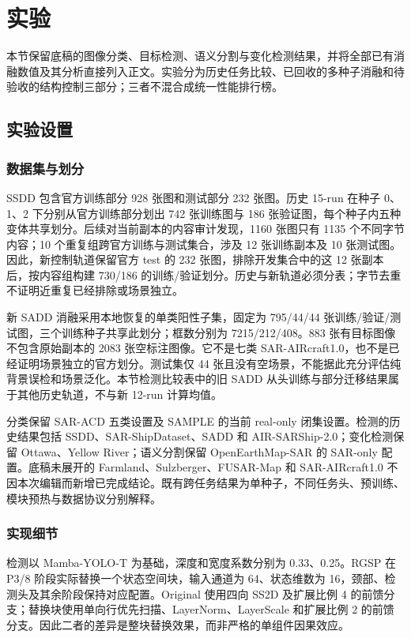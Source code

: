\section{实验}\label{sec:experiments}
本节保留底稿的图像分类、目标检测、语义分割与变化检测结果，并将全部已有消融数值及其分析直接列入正文。实验分为历史任务比较、已回收的多种子消融和待验收的结构控制三部分；三者不混合成统一性能排行榜。

\subsection{实验设置}\label{sec:experimental_settings}
\subsubsection{数据集与划分}\label{sec:datasets}
SSDD 包含官方训练部分 928 张图和测试部分 232 张图\cite{ssdd2017,ssdd2021}。历史 15-run 在种子 0、1、2 下分别从官方训练部分划出 742 张训练图与 186 张验证图，每个种子内五种变体共享划分。后续对当前副本的内容审计发现，1160 张图只有 1135 个不同字节内容；10 个重复组跨官方训练与测试集合，涉及 12 张训练副本及 10 张测试图。因此，新控制轨道保留官方 test 的 232 张图，排除开发集合中的这 12 张副本后，按内容组构建 730/186 的训练/验证划分。历史与新轨道必须分表；字节去重不证明近重复已经排除或场景独立。

新 SADD 消融采用本地恢复的单类阳性子集，固定为 795/44/44 张训练/验证/测试图，三个训练种子共享此划分；框数分别为 7215/212/408。883 张有目标图像不包含原始副本的 2083 张空标注图像。它不是七类 SAR-AIRcraft1.0，也不是已经证明场景独立的官方划分。测试集仅 44 张且没有空场景，不能据此充分评估纯背景误检和场景泛化。本节检测比较表中的旧 SADD 从头训练与部分迁移结果属于其他历史轨道，不与新 12-run 计算均值。

分类保留 SAR-ACD 五类设置及 SAMPLE 的当前 real-only 闭集设置。检测的历史结果包括 SSDD、SAR-ShipDataset、SADD 和 AIR-SARShip-2.0；变化检测保留 Ottawa、Yellow River；语义分割保留 OpenEarthMap-SAR 的 SAR-only 配置。底稿未展开的 Farmland、Sulzberger、FUSAR-Map 和 SAR-AIRcraft1.0 不因本次编辑而新增已完成结论。既有跨任务结果为单种子，不同任务头、预训练、模块预热与数据协议分别解释。

\subsubsection{实现细节}\label{sec:implementation_details}
检测以 Mamba-YOLO-T 为基础，深度和宽度系数分别为 0.33、0.25。RGSP 在 P3/8 阶段实际替换一个状态空间块，输入通道为 64、状态维数为 16，颈部、检测头及其余阶段保持对应配置。Original 使用四向 SS2D 及扩展比例 4 的前馈分支；替换块使用单向行优先扫描、LayerNorm、LayerScale 和扩展比例 2 的前馈分支。因此二者的差异是整块替换效果，而非严格的单组件因果效应。


